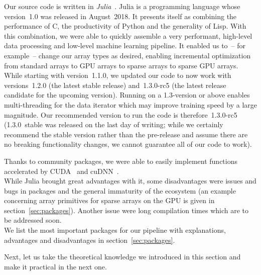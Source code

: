 Our source code is written in
\emph{Julia}~\cite{bezansonJuliaFreshApproach2017}. Julia is a
programming language whose version~1.0 was released in August~2018. It
presents itself as combining the performance of C, the productivity of
Python and the generality of Lisp. With this combination, we were able
to quickly assemble a very performant, high-level data processing and
low-level machine learning pipeline. It enabled us to~-- for example~--
change our array types as desired, enabling incremental optimization
from standard arrays to GPU arrays to sparse arrays to sparse GPU
arrays. While starting with version~1.1.0, we updated our code to now
work with versions~1.2.0 (the latest stable release)
and~\mbox{1.3.0-rc5} (the latest release candidate for the upcoming
version). Running on a 1.3-version or above enables multi-threading
for the data iterator which may improve training speed by a large
magnitude. Our recommended version to run the code is
therefore~\mbox{1.3.0-rc5} (1.3.0~stable was released on the last day
of writing; while we certainly recommend the stable version rather
than the pre-release and assume there are no breaking functionality
changes, we cannot guarantee all of our code to work).

Thanks to community packages, we were able to easily implement
functions accelerated by CUDA~\cite{CUDAToolkit2013} and
cuDNN~\cite{NVIDIACuDNN2014}. \\
While Julia brought great advantages with it, some disadvantages were
issues and bugs in packages and the general immaturity of the
ecosystem (an example concerning array primitives for sparse arrays on
the GPU is given in section~\ref{sec:packages}). Another issue were
long compilation times which are to be addressed soon. \\
We list the most important packages for our pipeline with
explanations, advantages and disadvantages in
section~\ref{sec:packages}.

Next, let us take the theoretical knowledge we introduced in this
section and make it practical in the next one.


